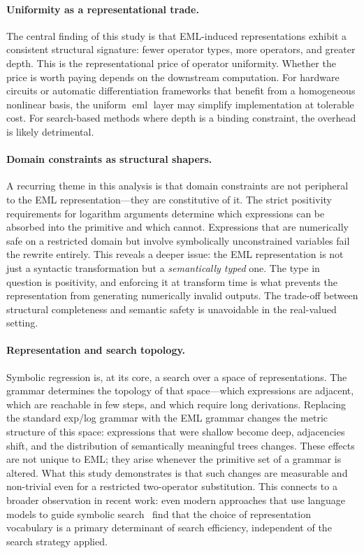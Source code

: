 \documentclass[11pt,a4paper]{article}
\newcommand{\eml}{\operatorname{eml}}
\begin{document}
\paragraph{Uniformity as a representational trade.}
The central finding of this study is that EML-induced representations
exhibit a consistent structural signature: fewer operator types,
more operators, and greater depth. This is the representational
price of operator uniformity. Whether the price is worth paying
depends on the downstream computation. For hardware circuits or
automatic differentiation frameworks that benefit from a homogeneous
nonlinear basis, the uniform $\eml$ layer may simplify implementation
at tolerable cost. For search-based methods where depth is a binding
constraint, the overhead is likely detrimental.

\paragraph{Domain constraints as structural shapers.}
A recurring theme in this analysis is that domain constraints are not
peripheral to the EML representation---they are constitutive of it.
The strict positivity requirements for logarithm arguments determine
which expressions can be absorbed into the primitive and which cannot.
Expressions that are numerically safe on a restricted domain but involve
symbolically unconstrained variables fail the rewrite entirely. This
reveals a deeper issue: the EML representation is not just a syntactic
transformation but a \emph{semantically typed} one. The type in question
is positivity, and enforcing it at transform time is what prevents the
representation from generating numerically invalid outputs. The
trade-off between structural completeness and semantic safety is
unavoidable in the real-valued setting.

\paragraph{Representation and search topology.}
Symbolic regression is, at its core, a search over a space of
representations. The grammar determines the topology of that space---which
expressions are adjacent, which are reachable in few steps, and which
require long derivations. Replacing the standard exp/log grammar with
the EML grammar changes the metric structure of this space: expressions
that were shallow become deep, adjacencies shift, and the distribution
of semantically meaningful trees changes. These effects are not unique
to EML; they arise whenever the primitive set of a grammar is altered.
What this study demonstrates is that such changes are measurable and
non-trivial even for a restricted two-operator substitution. This
connects to a broader observation in recent work: even modern approaches
that use language models to guide symbolic search~\cite{grayeli2024lasr}
find that the choice of representation vocabulary is a primary determinant
of search efficiency, independent of the search strategy applied.
\end{document}

